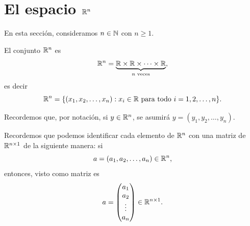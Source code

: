 \documentclass[a4,11pt]{aleph-notas}
\begin{document}
\encabezado

\section{El espacio $\R^n$}

En esta sección, consideramos $n\in\N$ con $n\geq 1$.

\begin{defi}[El conjunto $\R^n$]
    El conjunto $\R^n$ es
    \[
        \R^n=\underbrace{\R\times\R\times\cdots\times\R}_{n\text{ veces}},
    \]
    es decir
    \[
        \R^n=\{(x_1,x_2,\ldots,x_n):x_i\in\R\text{ para todo }i=1,2,\ldots,n\}.
    \]
\end{defi}

\begin{advertencia}
    Recordemos que, por notación, si $y\in\R^n$, se asumirá $y=(y_1,y_2,\ldots,y_n)$.
\end{advertencia}

\begin{advertencia}
    Recordemos que podemos identificar cada elemento de $\R^n$ con una matriz de $\Mat[\R]{n}{1}$ de la siguiente manera: si
    \[
        a = (a_1,a_2,\ldots,a_n) \in \R^n,
    \]
    entonces, visto como matriz es
    \[
        a = 
        \begin{pmatrix}
            a_1\\a_2\\
            \vdots\\a_n
        \end{pmatrix}
        \in \Mat[\R]{n}{1}.
    \]
\end{advertencia}
\end{document}

